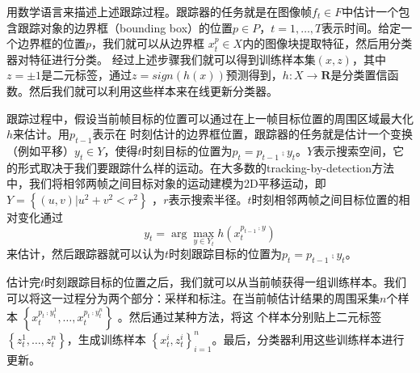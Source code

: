 用数学语言来描述上述跟踪过程。跟踪器的任务就是在图像帧${f_t} \in F$中估计一个包含跟踪对象的边界框（bounding box）的位置$p \in P$，$t = 1,\dots,T$表示时间。给定一个边界框的位置$p$，我们就可以从边界框
$x_t^p \in X$内的图像块提取特征，然后用分类器对特征进行分类。
经过上述步骤我们就可以得到训练样本集$(x,z)$，其中 $z =  \pm 1$是二元标签，通过$z = sign(h(x))$预测得到，$h:X\rightarrow\textbf{R}$是分类置信函数。然后我们就可以利用这些样本来在线更新分类器。

跟踪过程中，假设当前帧目标的位置可以通过在上一帧目标位置的周围区域最大化$h$来估计。用$p_{t-1}$表示在 时刻估计的边界框位置，跟踪器的任务就是估计一个变换（例如平移）$y_t \in Y$，使得$t$时刻目标的位置为$p_t=p_{t-1}\comp y_t$。$Y$表示搜索空间，它的形式取决于我们要跟踪什么样的运动。在大多数的tracking-by-detection方法中，我们将相邻两帧之间目标对象的运动建模为2D平移运动，即$Y = \left\{ {(u,v)|{u^2} + {v^2} < {r^2}} \right\}$ ，$r$表示搜索半径。$t$时刻相邻两帧之间目标位置的相对变化通过
\begin{equation}
{y_t} = \arg \mathop {\max }\limits_{y \in {Y_t}} h(x_t^{{p_{t - 1}} \comp y})
\end{equation}
来估计，然后跟踪器就可以认为$t$时刻跟踪目标的位置为${p_t} = {p_{t - 1}} \comp {y_t}$。

估计完$t$时刻跟踪目标的位置之后，我们就可以从当前帧获得一组训练样本。我们可以将这一过程分为两个部分：采样和标注。在当前帧估计结果的周围采集$n$个样本
$\left\{ {x_t^{{p_t} \comp y_t^1},\dots,x_t^{{p_t} \comp y_t^n}} \right\}$ 。然后通过某种方法，将这 个样本分别贴上二元标签
$\left\{ {z_t^1,\dots,z_t^n} \right\}$，生成训练样本
$\left\{ {x_t^i,z_t^i} \right\}_{i = 1}^n$。最后，分类器利用这些训练样本进行更新。

